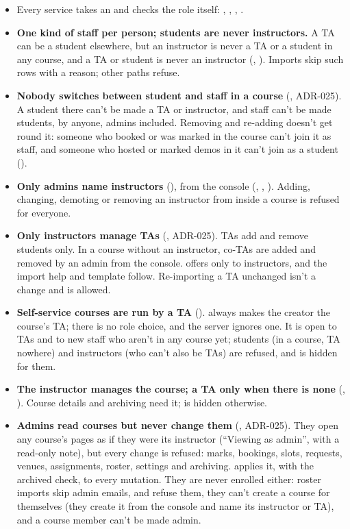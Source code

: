 \begin{itemize}
  \item Every service takes an  and checks the role itself: , , , .
  \item \textbf{One kind of staff per person; students are never instructors.} A TA can be a student elsewhere, but an instructor is never a TA or a student in any course, and a TA or student is never an instructor (, ). Imports skip such rows with a reason; other paths refuse.
  \item \textbf{Nobody switches between student and staff in a course} (, ADR-025). A student there can't be made a TA or instructor, and staff can't be made students, by anyone, admins included. Removing and re-adding doesn't get round it: someone who booked or was marked in the course can't join it as staff, and someone who hosted or marked demos in it can't join as a student ().
  \item \textbf{Only admins name instructors} (), from the console (, , ). Adding, changing, demoting or removing an instructor from inside a course is refused for everyone.
  \item \textbf{Only instructors manage TAs} (, ADR-025). TAs add and remove students only. In a course without an instructor, co-TAs are added and removed by an admin from the console.  offers  only to instructors, and the import help and template follow. Re-importing a TA unchanged isn't a change and is allowed.
  \item \textbf{Self-service courses are run by a TA} ().  always makes the creator the course's TA; there is no role choice, and the server ignores one. It is open to TAs and to new staff who aren't in any course yet; students (in a course, TA nowhere) and instructors (who can't also be TAs) are refused, and  is hidden for them.
  \item \textbf{The instructor manages the course; a TA only when there is none} (, ). Course details and archiving need it;  is hidden otherwise.
  \item \textbf{Admins read courses but never change them} (, ADR-025). They open any course's pages as if they were its instructor (``Viewing as admin'', with a read-only note), but every change is refused: marks, bookings, slots, requests, venues, assignments, roster, settings and archiving.  applies it, with the archived check, to every mutation. They are never enrolled either: roster imports skip admin emails,  and  refuse them, they can't create a course for themselves (they create it from the console and name its instructor or TA), and a course member can't be made admin.

\end{itemize}
